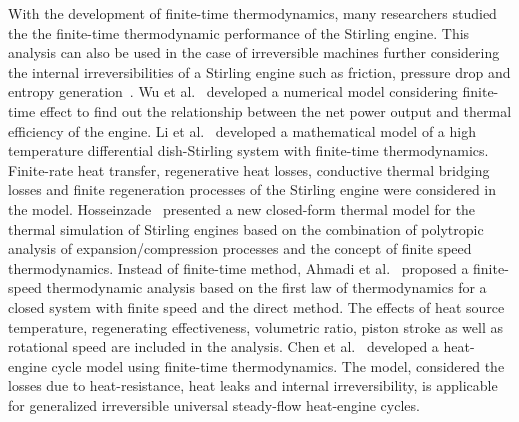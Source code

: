 With the development of finite-time thermodynamics, many researchers studied the the finite-time thermodynamic performance of the Stirling engine. This analysis can also be used in the case of irreversible machines further considering the internal irreversibilities of a Stirling engine such as friction, pressure drop and entropy generation~\cite{Barreto2017}.
Wu et al.~\cite{Wu1998} developed a numerical model considering finite-time effect to find out the relationship between the net power output and thermal efficiency of the engine.
Li et al.~\cite{Li2011} developed a mathematical model of a high temperature differential dish-Stirling system with finite-time thermodynamics. Finite-rate heat transfer, regenerative heat losses, conductive thermal bridging losses and finite regeneration processes of the Stirling engine were considered in the model.
Hosseinzade~\cite{Hosseinzade2015} presented a new closed-form thermal model for the thermal simulation of Stirling engines based on the combination of polytropic analysis of expansion/compression processes and the concept of finite speed thermodynamics.
Instead of finite-time method, Ahmadi et al.~\cite{Ahmadi2016b} proposed a finite-speed thermodynamic analysis based on the first law of thermodynamics for a closed system with finite speed and the direct method. The effects of heat source temperature, regenerating effectiveness, volumetric ratio, piston stroke as well as rotational speed are included in the analysis.
Chen et al.~\cite{Chen2007} developed a heat-engine cycle model using finite-time thermodynamics. The model, considered the losses due to heat-resistance, heat leaks and internal irreversibility, is applicable for generalized irreversible universal steady-flow heat-engine cycles.

